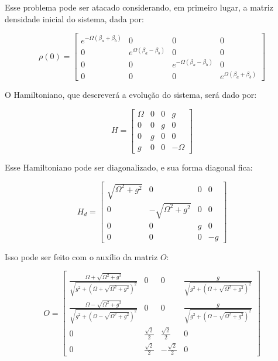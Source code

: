 Esse problema pode ser atacado considerando, em primeiro lugar, a matriz densidade inicial do sistema, dada por:

\begin{equation}
\rho(0) = \left[\begin{matrix}e^{- \Omega \left(\beta_{a} + \beta_{b}\right)} & 0 & 0 & 0\\0 & e^{\Omega \left(\beta_{a} - \beta_{b}\right)} & 0 & 0\\0 & 0 & e^{- \Omega \left(\beta_{a} - \beta_{b}\right)} & 0\\0 & 0 & 0 & e^{\Omega \left(\beta_{a} + \beta_{b}\right)}\end{matrix}\right]
\end{equation}

O Hamiltoniano, que descreverá a evolução do sistema, será dado por:

\begin{equation}
H =\left[\begin{matrix}\Omega & 0 & 0 & g\\0 & 0 & g & 0\\0 & g & 0 & 0\\g & 0 & 0 & - \Omega\end{matrix}\right]
\end{equation}

Esse Hamiltoniano pode ser diagonalizado, e sua forma diagonal fica:

\begin{equation}
H_d = \left[\begin{matrix}\sqrt{\Omega^{2} + g^{2}} & 0 & 0 & 0\\0 & - \sqrt{\Omega^{2} + g^{2}} & 0 & 0\\0 & 0 & g & 0\\0 & 0 & 0 & - g\end{matrix}\right]
\end{equation}

Isso pode ser feito com o auxílio da matriz $O$:

\begin{equation}
O = \left[\begin{matrix}\frac{\Omega + \sqrt{\Omega^{2} + g^{2}}}{\sqrt{g^{2} + \left(\Omega + \sqrt{\Omega^{2} + g^{2}}\right)^{2}}} & 0 & 0 & \frac{g}{\sqrt{g^{2} + \left(\Omega + \sqrt{\Omega^{2} + g^{2}}\right)^{2}}}\\\frac{\Omega - \sqrt{\Omega^{2} + g^{2}}}{\sqrt{g^{2} + \left(\Omega - \sqrt{\Omega^{2} + g^{2}}\right)^{2}}} & 0 & 0 & \frac{g}{\sqrt{g^{2} + \left(\Omega - \sqrt{\Omega^{2} + g^{2}}\right)^{2}}}\\0 & \frac{\sqrt{2}}{2} & \frac{\sqrt{2}}{2} & 0\\0 & \frac{\sqrt{2}}{2} & - \frac{\sqrt{2}}{2} & 0\end{matrix}\right]
\end{equation}

